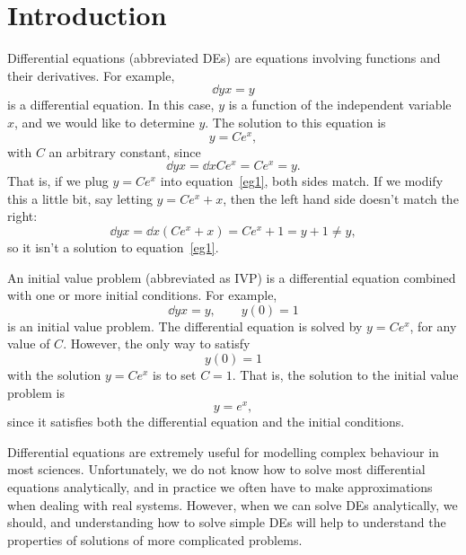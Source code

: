 \documentclass[10pt,driverfallback=hypertex]{report}
\begin{document}

\newpage
\pagestyle{plain}

\section*{Introduction}

Differential equations (abbreviated DEs) are equations involving functions and
their derivatives. For example,
\begin{dmath}
  \label{eg1}
  \dd{y}{x} =y
\end{dmath}
is a differential equation. In this case, $y$ is a function of the independent
variable $x$, and we would like to determine $y$. The solution to this
equation is
\begin{dmath*}
  y = Ce^x,
\end{dmath*}
with $C$ an arbitrary constant, since 
\begin{dmath*}\dd{y}{x}=\dd{}{x}Ce^x=Ce^x=y.\end{dmath*} 
That is, if we
plug $y=Ce^x$ into equation~\eqref{eg1}, both sides match. If we modify this
a little bit, say letting $y=Ce^x +x$, then the left hand side doesn't
match the right:
\begin{dmath*}
  \dd{y}{x} = \dd{}{x}(Ce^x +x) 
  = Ce^x + 1 = y +1 
  \neq y,
\end{dmath*}
so it isn't a solution to equation~\eqref{eg1}.

An initial value problem (abbreviated as IVP) is a differential equation
combined with one or more initial conditions. For example,
\begin{dmath*}[compact]
  \dd{y}{x}=y, \qquad y(0)=1
\end{dmath*}
is an initial value problem.
The differential equation is solved by $y=Ce^x$, for any value of $C$. However,
the only way to satisfy 
\begin{dmath*}
  y(0)=1
\end{dmath*}
with the solution $y=Ce^x$ is to set $C=1$. That is, the solution to
the initial value problem is 
\begin{dmath*}
  y=e^x,
\end{dmath*}
since it satisfies both the differential equation and the initial
conditions.

Differential equations are extremely useful for modelling complex behaviour in
most sciences. Unfortunately, we do not know how to solve most
differential equations analytically, and in practice we often have to
make approximations when dealing with real systems. However, when we can solve
DEs analytically, we should, and understanding how to solve simple DEs will
help to understand the properties of solutions of more complicated problems.
\end{document}
